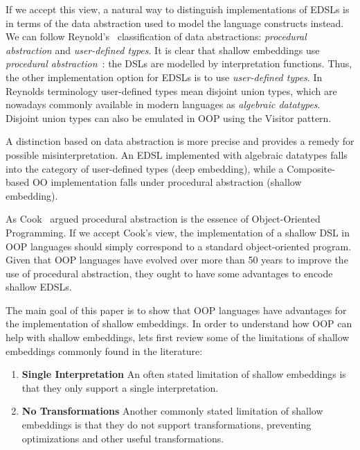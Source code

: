 If we accept this view, 
a natural way to distinguish implementations of EDSLs is 
in terms of the data abstraction used to model the language
constructs instead. We can follow Reynold's~\cite{} classification of
data abstractions: \emph{procedural abstraction} and \emph{user-defined
  types}. It is clear that shallow embeddings use \emph{procedural
  abstraction}~\cite{}: the DSLs are modelled by interpretation
functions. Thus, the other implementation option for EDSLs is to
use \emph{user-defined types}. In Reynolds terminology user-defined
types mean disjoint union types, which are nowadays commonly available
in modern languages as \emph{algebraic datatypes}. Disjoint union
types can also be emulated in OOP using the {\sc Visitor} pattern. 

A distinction based on data abstraction is more precise and provides a
remedy for possible misinterpretation. An EDSL implemented with
algebraic datatypes falls into the category of user-defined types
(deep embedding), while a Composite-based OO implementation falls
under procedural abstraction (shallow embedding). 


As Cook~\cite{} argued
procedural abstraction is the essence of Object-Oriented
Programming. If we accept Cook's view, the implementation of a shallow
DSL in OOP languages should simply correspond to a standard
object-oriented program. Given that OOP languages have
evolved over more than 50 years to improve the use of procedural
abstraction, they ought to have some advantages to encode shallow
EDSLs.

The main goal of this paper is to show that OOP languages have advantages for the
implementation of shallow embeddings.  
In order to understand how OOP can help with shallow embeddings, lets
first review some of the limitations of shallow embeddings commonly found in
the literature:

\begin{enumerate}

\item {\bf Single Interpretation} An often stated limitation of
  shallow embeddings is that they only support a single
  interpretation.

\item {\bf No Transformations} Another commonly stated limitation 
of shallow embeddings is that they do not support transformations,
preventing optimizations and other useful transformations.

\end{enumerate}

